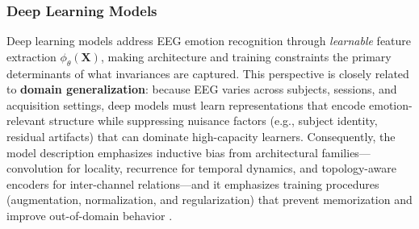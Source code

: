 \documentclass{WileyMSP-template}
\begin{document}
\subsubsection{Deep Learning Models}
\label{sec:deep_learning_models}

Deep learning models address EEG emotion recognition through \emph{learnable} feature extraction $\phi_{\theta}(\mathbf{X})$, making architecture and training constraints the primary determinants of what invariances are captured. This perspective is closely related to \textbf{domain generalization}: because EEG varies across subjects, sessions, and acquisition settings, deep models must learn representations that encode emotion-relevant structure while suppressing nuisance factors (e.g., subject identity, residual artifacts) that can dominate high-capacity learners. Consequently, the model description emphasizes inductive bias from architectural families---convolution for locality, recurrence for temporal dynamics, and topology-aware encoders for inter-channel relations---and it emphasizes training procedures (augmentation, normalization, and regularization) that prevent memorization and improve out-of-domain behavior \cite{yroyhb2019deeplear,jcheng2021emotionr,sliuxw2020subjecti,tzhang2019spatialt,saydn2020deeplear,nssuha2020eegbased}.
\end{document}

